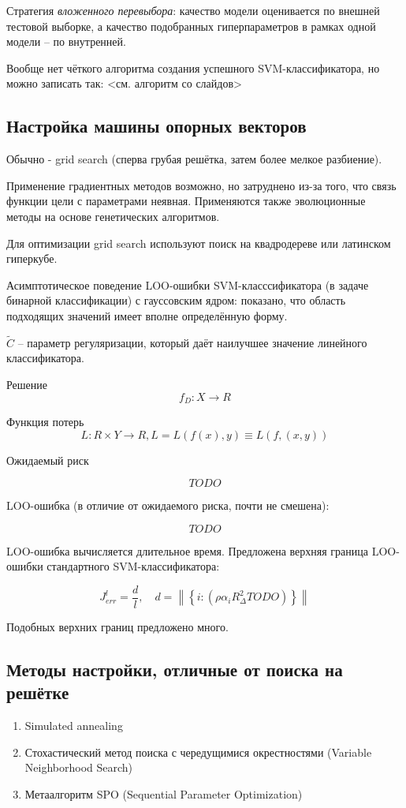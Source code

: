 \documentclass[main.tex]{subfiles}
\begin{document}
Стратегия \emph{вложенного перевыбора}: качество модели оценивается по внешней тестовой выборке, а качество подобранных гиперпараметров в рамках одной модели -- по внутренней.

Вообще нет чёткого алгоритма создания успешного SVM-классификатора, но можно записать так:
<см. алгоритм со слайдов>

\subsection{Настройка машины опорных векторов}
Обычно - grid search (сперва грубая решётка, затем более мелкое разбиение).

Применение градиентных методов возможно, но затруднено из-за того, что связь функции цели с параметрами неявная.
Применяются также эволюционные методы на основе генетических алгоритмов.

Для оптимизации grid search используют поиск на квадродереве или латинском гиперкубе.

Асимптотическое поведение LOO-ошибки SVM-класссификатора (в задаче бинарной классификации) с гауссовским ядром: показано, что область подходящих значений имеет вполне определённую форму.


$\tilde C$ -- параметр регуляризации, который даёт наилучшее значение линейного классификатора.

Решение
\[ f_D: X \to R \]

Функция потерь
\[ L: R \times Y \to R, L = L(f(x), y) \equiv L(f, (x,y)) \]

Ожидаемый риск

\[ TODO \]

LOO-ошибка (в отличие от ожидаемого риска, почти не смешена):

\[ TODO \]

LOO-ошибка вычисляется длительное время.
Предложена верхняя граница LOO-ошибки стандартного SVM-классификатора:

\[ J_{err}^l = \frac{d}{l}, \quad d = \left\| \left\{ i: (\rho \alpha_i R^2_\Delta TODO) \right\} \right\| \]

Подобных верхних границ предложено много.

\subsection{Методы настройки, отличные от поиска на решётке}

\begin{enumerate}[noitemsep]
	\item Simulated annealing
	\item Стохастический метод поиска с чередущимися окрестностями (Variable Neighborhood Search)
	\item Метаалгоритм SPO (Sequential Parameter Optimization)
\end{enumerate}
\end{document}

